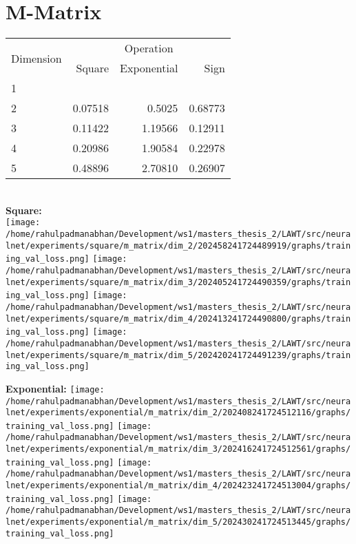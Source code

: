 \documentclass{article}
\begin{document}
\pagebreak
\section{M-Matrix}
\begin{tabular}{@{}lrrr@{}}
\toprule
\multirow{2}{*}{Dimension} & \multicolumn{3}{c}{Operation} \\
\cmidrule(l){2-4}
& Square & Exponential & Sign \\
\midrule
1 & & & \\
2 & 0.07518 & 0.5025 & 0.68773 \\
3 & 0.11422 & 1.19566 & 0.12911 \\
4 & 0.20986 & 1.90584 & 0.22978 \\
5 & 0.48896 & 2.70810 & 0.26907 \\
\bottomrule
\end{tabular}
\\

\textbf{Square:}
\\
\texttt{[image: /home/rahulpadmanabhan/Development/ws1/masters\_thesis\_2/LAWT/src/neuralnet/experiments/square/m\_matrix/dim\_2/202458241724489919/graphs/training\_val\_loss.png]}
\texttt{[image: /home/rahulpadmanabhan/Development/ws1/masters\_thesis\_2/LAWT/src/neuralnet/experiments/square/m\_matrix/dim\_3/202405241724490359/graphs/training\_val\_loss.png]}
\texttt{[image: /home/rahulpadmanabhan/Development/ws1/masters\_thesis\_2/LAWT/src/neuralnet/experiments/square/m\_matrix/dim\_4/202413241724490800/graphs/training\_val\_loss.png]}
\texttt{[image: /home/rahulpadmanabhan/Development/ws1/masters\_thesis\_2/LAWT/src/neuralnet/experiments/square/m\_matrix/dim\_5/202420241724491239/graphs/training\_val\_loss.png]}

\textbf{Exponential:}
\texttt{[image: /home/rahulpadmanabhan/Development/ws1/masters\_thesis\_2/LAWT/src/neuralnet/experiments/exponential/m\_matrix/dim\_2/202408241724512116/graphs/training\_val\_loss.png]}
\texttt{[image: /home/rahulpadmanabhan/Development/ws1/masters\_thesis\_2/LAWT/src/neuralnet/experiments/exponential/m\_matrix/dim\_3/202416241724512561/graphs/training\_val\_loss.png]}
\texttt{[image: /home/rahulpadmanabhan/Development/ws1/masters\_thesis\_2/LAWT/src/neuralnet/experiments/exponential/m\_matrix/dim\_4/202423241724513004/graphs/training\_val\_loss.png]}
\texttt{[image: /home/rahulpadmanabhan/Development/ws1/masters\_thesis\_2/LAWT/src/neuralnet/experiments/exponential/m\_matrix/dim\_5/202430241724513445/graphs/training\_val\_loss.png]}
\end{document}

